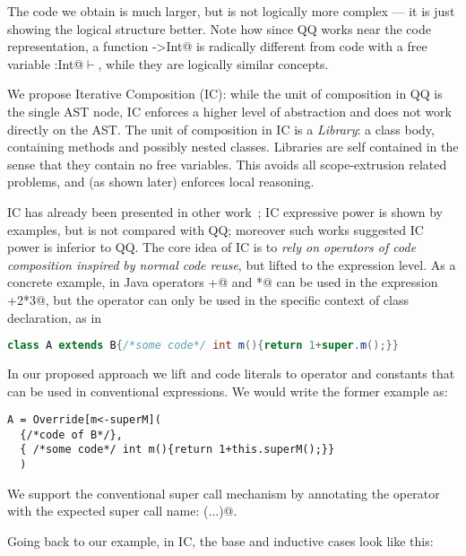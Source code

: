 The code we obtain is much larger, but is not logically more complex --- it is just showing the logical structure better.
Note how since QQ works near the code representation,
a function \Q@Int->Int@ is radically different from
code with a free variable \Q@x:Int@$\vdash$\Q@Int@, while they are 
logically similar concepts.


We propose Iterative Composition (IC):
while the unit of composition in QQ is the single AST node, 
IC enforces a higher level of abstraction and does not work directly on the AST.
The unit of composition in IC is a \emph{Library}:
a class body, containing methods and possibly nested classes.
Libraries are self contained in the sense that they contain no free variables.
This avoids all scope-extrusion related problems, and (as shown later) enforces local reasoning.

IC has already been presented in other work~\cite{servetto2014meta};
 IC expressive power is shown by examples,
but is not compared with QQ; moreover such works suggested IC power is inferior to QQ.
The core idea of IC is to  \emph{rely on  operators of code composition inspired by normal
code reuse}, but lifted to the expression level.
As a concrete example, in Java operators \Q@+@ and \Q@*@ can be used in the expression +2*3@,
but the operator \Q@extends@ can only be used in the specific context of class declaration, as in

\begin{lstlisting}[language=Java]
class A extends B{/*some code*/ int m(){return 1+super.m();}}
\end{lstlisting}

In our proposed approach we lift \Q@extends@ and code literals to operator and constants
that can be used in conventional expressions. We would write the former example as:

\begin{lstlisting}
A = Override[m<-superM]( 
  {/*code of B*/},
  { /*some code*/ int m(){return 1+this.superM();}}
  )
\end{lstlisting}

\noindent We support the conventional super call mechanism by annotating the operator with
the expected super call name: \Q@Override[m()<-superM()](...)@.



Going back to our \Q@pow@ example,
in IC, the base and inductive cases look like this:

